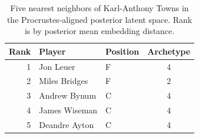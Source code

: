\begin{table}[htbp]
  \centering\small
  \begin{tabular}{rllc}
    \toprule
    Rank & Player & Position & Archetype \\
    \midrule
    1 & Jon Leuer & F & 4 \\
    2 & Miles Bridges & F & 2 \\
    3 & Andrew Bynum & C & 4 \\
    4 & James Wiseman & C & 4 \\
    5 & Deandre Ayton & C & 4 \\
    \bottomrule
  \end{tabular}
  \caption{Five nearest neighbors of Karl-Anthony Towns in the Procrustes-aligned posterior latent space. Rank is by posterior mean embedding distance.}
  \label{tab:Karl_Anthony_Towns_neighbors}
\end{table}

